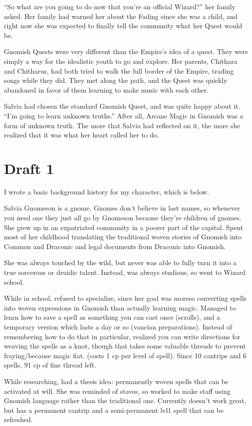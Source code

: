 \documentclass[12pt]{article}[titlepage]
\newcommand{\say}[1]{``#1''}
\renewcommand{\,}{\textsuperscript{,}}
\begin{document}
\say{So what are you going to do now that you're an official Wizard?} her family asked.
Her family had warned her about the Fading since she was a child, and right now she was expected to finally tell the community what her Quest would be.

Gnomish Quests were very different than the Empire's idea of a quest.
They were simply a way for the idealistic youth to go and explore.
Her parents, Chithara and Chitharus, had both tried to walk the full border of the Empire, trading songs while they did.
They met along the path, and the Quest was quickly abandoned in favor of them learning to make music with each other.

Salvia had chosen the standard Gnomish Quest, and was quite happy about it.
\say{I'm going to learn unknown truths.}
After all, Arcane Magic in Gnomish was a form of unknown truth.
The more that Salvia had reflected on it, the more she realized that it was what her heart called her to do.


\section{Draft 1}
I wrote a basic background history for my character, which is below.

Salvia Gnomeson is a gnome.
Gnomes don't believe in last names, so whenever you need one they just all go by Gnomeson because they're children of gnomes.
She grew up in an expatriated community in a poorer part of the capital.
Spent most of her childhood translating the traditional woven stories of Gnomish into Common and Draconic and legal documents from Draconic into Gnomish.

She was always touched by the wild, but never was able to fully turn it into a true sorcerous or druidic talent.
Instead, was always studious, so went to Wizard school.

While in school, refused to specialize, since her goal was moreso converting spells into woven expressions in Gnomish than actually learning magic.
Managed to learn how to save a spell as something you can cast once (scrolls), and a temporary version which lasts a day or so (vancian preparations).
Instead of remembering how to do that in particular, realized you can write directions for weaving the spells as a knot, though that takes some valuable threads to prevent fraying/because magic fiat. (costs 1 cp per level of spell).
Since 10 cantrips and 6 spells, 91 cp of fine thread left.

While researching, had a thesis idea: permanently woven spells that can be activated at will.
She was reminded of staves, so worked to make staff using Gnomish language rather than the traditional one.
Currently doesn't work great, but has a permanent cantrip and a semi-permanent lvl1 spell that can be refreshed.
\end{document}

